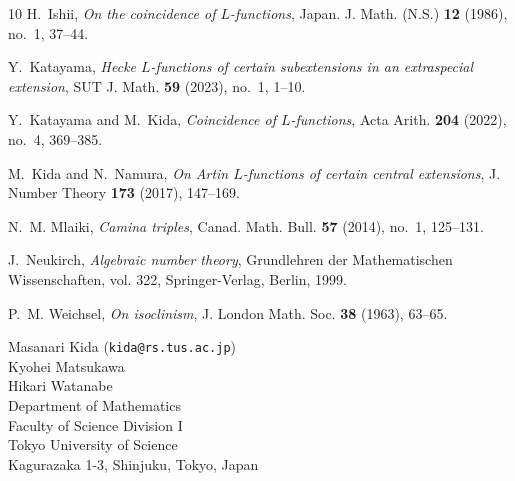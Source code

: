 \documentclass[a4paper,12pt]{article}
\theoremstyle{definition}
\theoremstyle{remark}
\numberwithin{equation}{section}
\begin{document}
\begin{thebibliography}{10}
H.~Ishii, \emph{On the coincidence of {$L$}-functions}, Japan. J. Math. (N.S.)
  \textbf{12} (1986), no.~1, 37--44.

Y.~Katayama, \emph{{Hecke $L$-functions of certain subextensions in an
  extraspecial extension}}, SUT J. Math. \textbf{59} (2023), no.~1, 1--10.

Y.~Katayama and M.~Kida, \emph{Coincidence of {$L$}-functions}, Acta Arith.
  \textbf{204} (2022), no.~4, 369--385.

M.~Kida and N.~Namura, \emph{On {A}rtin {$L$}-functions of certain central
  extensions}, J. Number Theory \textbf{173} (2017), 147--169.

N.~M. Mlaiki, \emph{Camina triples}, Canad. Math. Bull. \textbf{57} (2014),
  no.~1, 125--131.

J.~Neukirch, \emph{Algebraic number theory}, Grundlehren der Mathematischen
  Wissenschaften, vol. 322, Springer-Verlag, Berlin, 1999.

P.~M. Weichsel, \emph{On isoclinism}, J. London Math. Soc. \textbf{38} (1963),
  63--65.

\end{thebibliography}


\begin{flushleft}
Masanari Kida  (\texttt{kida@rs.tus.ac.jp})\\
 Kyohei Matsukawa \\
 Hikari Watanabe \\
 Department of Mathematics \\
 Faculty of Science Division I \\
Tokyo University of Science \\
Kagurazaka 1-3, Shinjuku, Tokyo, Japan
\end{flushleft}
\end{document}
